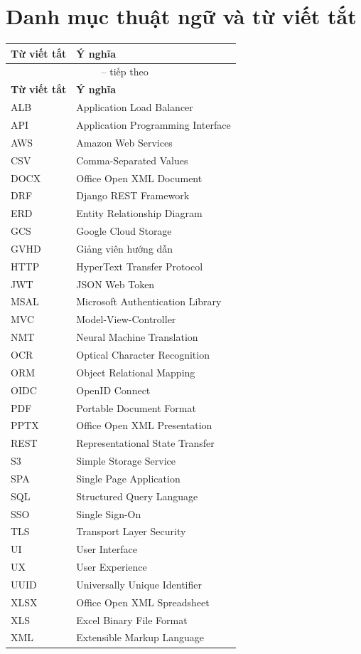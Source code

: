 \chapter*{Danh mục thuật ngữ và từ viết tắt}

\begin{longtable}{p{3.5cm} p{10cm}}
\toprule
\textbf{Từ viết tắt} & \textbf{Ý nghĩa} \\
\midrule
\endfirsthead
\multicolumn{2}{c}{\tablename\ \thetable{} -- tiếp theo} \\
\toprule
\textbf{Từ viết tắt} & \textbf{Ý nghĩa} \\
\midrule
\endhead
\bottomrule
\endfoot

ALB     & Application Load Balancer \\
API     & Application Programming Interface \\
AWS     & Amazon Web Services \\
CSV     & Comma-Separated Values \\
DOCX    & Office Open XML Document \\
DRF     & Django REST Framework \\
ERD     & Entity Relationship Diagram \\
GCS     & Google Cloud Storage \\
GVHD    & Giảng viên hướng dẫn \\
HTTP    & HyperText Transfer Protocol \\
JWT     & JSON Web Token \\
MSAL    & Microsoft Authentication Library \\
MVC     & Model-View-Controller \\
NMT     & Neural Machine Translation \\
OCR     & Optical Character Recognition \\
ORM     & Object Relational Mapping \\
OIDC    & OpenID Connect \\
PDF     & Portable Document Format \\
PPTX    & Office Open XML Presentation \\
REST    & Representational State Transfer \\
S3      & Simple Storage Service \\
SPA     & Single Page Application \\
SQL     & Structured Query Language \\
SSO     & Single Sign-On \\
TLS     & Transport Layer Security \\
UI      & User Interface \\
UX      & User Experience \\
UUID    & Universally Unique Identifier \\
XLSX    & Office Open XML Spreadsheet \\
XLS     & Excel Binary File Format \\
XML     & Extensible Markup Language \\

\bottomrule
\end{longtable}
